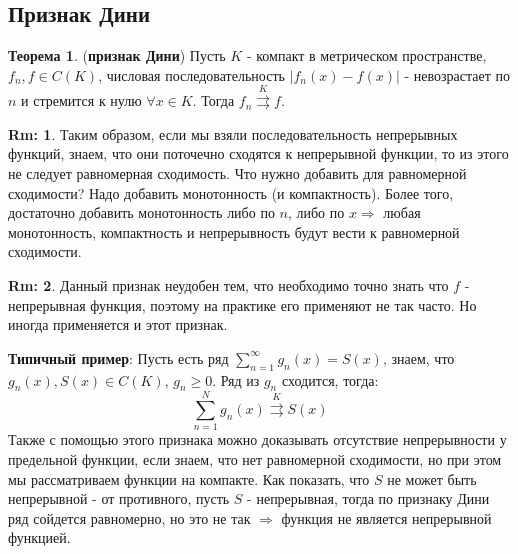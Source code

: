 \documentclass[12pt]{article}
\theoremstyle{definition}
\newtheorem{rem}{Rm:}
\newtheorem{theorem}{Теорема}
\newcommand{\ddsum}[2]{\displaystyle\sum\limits_{#1}^{#2}}
\newcommand{\uconv}[1]{\overset{#1}{\rightrightarrows}}
\begin{document}
\newpage
\subsection*{Признак Дини}
\begin{theorem}(\textbf{признак Дини})
	Пусть $K$ - компакт в метрическом пространстве, $f_n, f \in C(K)$, числовая последовательность $|f_n(x) - f(x)|$ - невозрастает по $n$ и стремится к нулю $\forall x \in K$. Тогда $f_n \uconv{K} f$.
\end{theorem}
\begin{rem}
	Таким образом, если мы взяли последовательность непрерывных функций, знаем, что они поточечно сходятся к непрерывной функции, то из этого не следует равномерная сходимость. Что нужно добавить для равномерной сходимости? Надо добавить монотонность (и компактность). Более того, достаточно добавить монотонность либо по $n$, либо по $x \Rightarrow$ любая монотонность, компактность и непрерывность будут вести к равномерной сходимости.	
\end{rem}
\begin{rem}
	Данный признак неудобен тем, что необходимо точно знать что $f$ -  непрерывная функция, поэтому на практике его применяют не так часто. Но иногда применяется и этот признак.
\end{rem}

\textbf{Типичный пример}: Пусть есть ряд $\ddsum{ n = 1 }{\infty} g_n(x)  = S(x)$, знаем, что $g_n(x), S(x) \in C(K), \, g_n \geq 0$. Ряд из $g_n$ сходится, тогда:
$$
	\ddsum{ n = 1 }{N} g_n(x) \uconv{K} S(x)
$$
Также с помощью этого признака можно доказывать отсутствие непрерывности у предельной функции, если знаем, что нет равномерной сходимости, но при этом мы рассматриваем функции на компакте. Как показать, что $S$ не может быть непрерывной - от противного, пусть $S$ - непрерывная, тогда по признаку Дини ряд сойдется равномерно, но это не так $\Rightarrow$ функция не является непрерывной функцией.
\end{document}

